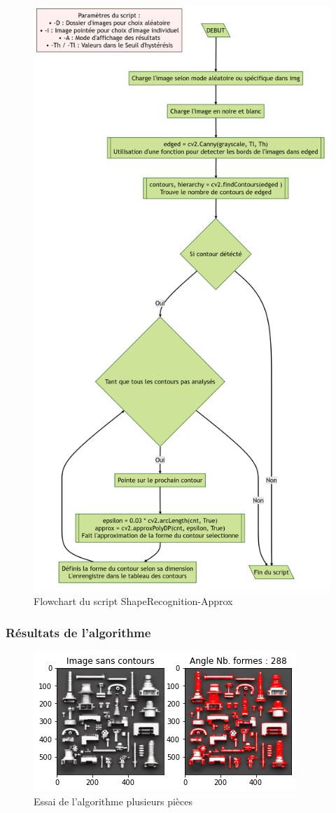	\begin{figure}[h!]
		\centering
		\includegraphics[width=0.65\linewidth]{../Flowcharts/ShapeRecogn.png}
		\caption{Flowchart du script ShapeRecognition-Approx}
		\label{fig:FlowShapeRecog}
	\end{figure}
	
	\clearpage
	
	
	\subsubsection{Résultats de l'algorithme}
	
	\begin{figure}[h]
		\centering
		\includegraphics[width=0.8\linewidth]{Figures/ShapeRecogn_Exemple1}
		\caption{Essai de l'algorithme plusieurs pièces}
		\label{fig:shaperecognexemple1}
	\end{figure}
	
